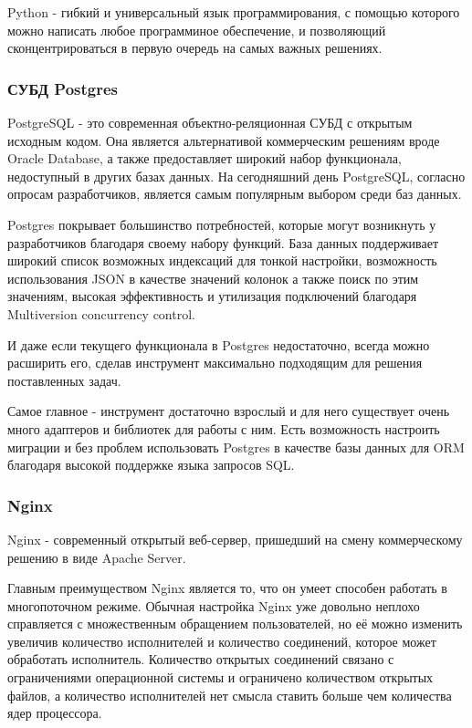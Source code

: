 \documentclass[14pt]{extarticle}
\begin{document}
Python - гибкий и универсальный язык программирования, с помощью которого можно написать любое программиное обеспечение, и позволяющий
сконцентрироваться в первую очередь на самых важных решениях.

\subsubsection{СУБД Postgres}

PostgreSQL - это современная объектно-реляционная СУБД с открытым исходным кодом. Она является альтернативой
коммерческим решениям вроде Oracle Database, а также предоставляет широкий набор функционала, недоступный в 
других базах данных. На сегодняшний день PostgreSQL, согласно опросам разработчиков, является самым популярным
выбором среди баз данных.

Postgres покрывает большинство потребностей, которые могут возникнуть у разработчиков благодаря своему набору 
функций. База данных поддерживает широкий список возможных индексаций для тонкой настройки, возможность
использования JSON в качестве значений колонок а также поиск по этим значениям, высокая эффективность и утилизация
подключений благодаря Multiversion concurrency control.

И даже если текущего функционала в Postgres недостаточно, всегда можно расширить его, сделав инструмент максимально подходящим
для решения поставленных задач.

Самое главное - инструмент достаточно взрослый и для него существует очень много адаптеров и библиотек для работы с ним. 
Есть возможность настроить миграции и без проблем использовать Postgres в качестве базы данных для ORM благодаря высокой
поддержке языка запросов SQL.

\subsubsection{Nginx}

Nginx - современный открытый веб-сервер, пришедший на смену коммерческому решению в виде Apache Server. 

Главным преимуществом Nginx является то, что он умеет способен работать в многопоточном режиме. Обычная
настройка Nginx уже довольно неплохо справляется с множественным обращением пользователей, но её можно 
изменить увеличив количество исполнителей и количество соединений, которое может обработать исполнитель.
Количество открытых соединений связано с ограничениями операционной системы и ограничено количеством открытых файлов, 
а количество исполнителей нет смысла ставить больше чем количества ядер процессора.
\end{document}
